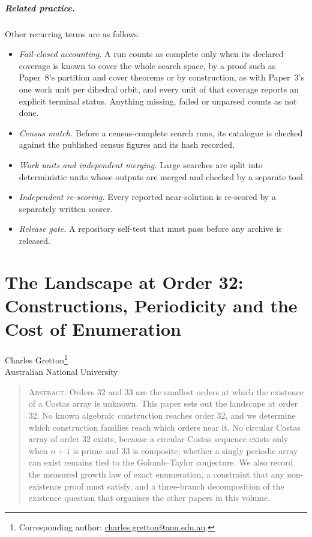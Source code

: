 \documentclass[11pt,a4paper,oneside]{report}
\makeatletter
\theoremstyle{definition}
\newcommand{\paperauthor}{\begin{center}\large Charles Gretton\footnote{Corresponding author: \href{mailto:charles.gretton@anu.edu.au}{charles.gretton@anu.edu.au}.}\\[2pt]\normalsize Australian National University\end{center}\vspace{0.5em}}
\newcommand{\paperabstract}[1]{\begin{quote}\small\noindent\textsc{Abstract.} #1\end{quote}\vspace{0.5em}}
\makeatother
\begin{document}
\paragraph{Related practice.} Other recurring terms are as follows.
\begin{itemize}
\item \emph{Fail-closed accounting.} A run counts as complete only when its declared coverage is known to cover the whole search space, by a proof such as Paper~8's partition and cover theorems or by construction, as with Paper~3's one work unit per dihedral orbit, and every unit of that coverage reports an explicit terminal status. Anything missing, failed or unparsed counts as not done.
\item \emph{Census match.} Before a census-complete search runs, its catalogue is checked against
the published census figures and its hash recorded.
\item \emph{Work units and independent merging.} Large searches are split into deterministic units
whose outputs are merged and checked by a separate tool.
\item \emph{Independent re-scoring.} Every reported near-solution is re-scored by a separately
written scorer.
\item \emph{Release gate.} A repository self-test that must pass before any archive is released.
\end{itemize}



\tableofcontents

\chapter{The Landscape at Order 32: Constructions, Periodicity and the Cost of Enumeration}\label{p1-paper}
\paperauthor
\paperabstract{Orders 32 and 33 are the smallest orders at which the existence of a Costas array is unknown.
This paper sets out the landscape at order 32. No known algebraic construction reaches order 32,
and we determine which construction families reach which orders near it. No circular Costas array
of order 32 exists, because a circular Costas sequence exists only when $n+1$ is prime and 33 is
composite; whether a singly periodic array can exist remains tied to the Golomb--Taylor conjecture.
We also record the measured growth law of exact enumeration, a constraint that any non-existence
proof must satisfy, and a three-branch decomposition of the existence question that organises the
other papers in this volume.}
\end{document}
